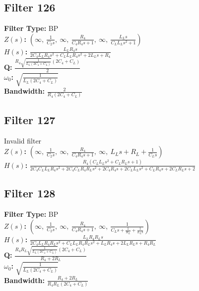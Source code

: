 \documentclass{article}
\begin{document}
\subsection*{Filter 126}
\textbf{Filter Type:} BP \\ 
\textbf{$Z(s)$:} $\left( \infty, \  \frac{1}{C_{2} s}, \  \infty, \  \frac{R_{4}}{C_{4} R_{4} s + 1}, \  \infty, \  \frac{L_{L} s}{C_{L} L_{L} s^{2} + 1}\right)$ \\ 
\textbf{$H(s)$:} $\frac{L_{L} R_{4} s}{2 C_{4} L_{L} R_{4} s^{2} + C_{L} L_{L} R_{4} s^{2} + 2 L_{L} s + R_{4}}$ \\ 
\textbf{Q:} $\frac{R_{4} \sqrt{\frac{1}{L_{L} \left(2 C_{4} + C_{L}\right)}} \left(2 C_{4} + C_{L}\right)}{2}$ \\ 
\textbf{$\omega_0$:} $\sqrt{\frac{1}{L_{L} \left(2 C_{4} + C_{L}\right)}}$ \\ 
\textbf{Bandwidth:} $\frac{2}{R_{4} \left(2 C_{4} + C_{L}\right)}$ \\ 
\subsection*{Filter 127}
Invalid filter \\ 
\textbf{$Z(s)$:} $\left( \infty, \  \frac{1}{C_{2} s}, \  \infty, \  \frac{R_{4}}{C_{4} R_{4} s + 1}, \  \infty, \  L_{L} s + R_{L} + \frac{1}{C_{L} s}\right)$ \\ 
\textbf{$H(s)$:} $\frac{R_{4} \left(C_{L} L_{L} s^{2} + C_{L} R_{L} s + 1\right)}{2 C_{4} C_{L} L_{L} R_{4} s^{3} + 2 C_{4} C_{L} R_{4} R_{L} s^{2} + 2 C_{4} R_{4} s + 2 C_{L} L_{L} s^{2} + C_{L} R_{4} s + 2 C_{L} R_{L} s + 2}$ \\ 
\subsection*{Filter 128}
\textbf{Filter Type:} BP \\ 
\textbf{$Z(s)$:} $\left( \infty, \  \frac{1}{C_{2} s}, \  \infty, \  \frac{R_{4}}{C_{4} R_{4} s + 1}, \  \infty, \  \frac{1}{C_{L} s + \frac{1}{R_{L}} + \frac{1}{L_{L} s}}\right)$ \\ 
\textbf{$H(s)$:} $\frac{L_{L} R_{4} R_{L} s}{2 C_{4} L_{L} R_{4} R_{L} s^{2} + C_{L} L_{L} R_{4} R_{L} s^{2} + L_{L} R_{4} s + 2 L_{L} R_{L} s + R_{4} R_{L}}$ \\ 
\textbf{Q:} $\frac{R_{4} R_{L} \sqrt{\frac{1}{L_{L} \left(2 C_{4} + C_{L}\right)}} \left(2 C_{4} + C_{L}\right)}{R_{4} + 2 R_{L}}$ \\ 
\textbf{$\omega_0$:} $\sqrt{\frac{1}{L_{L} \left(2 C_{4} + C_{L}\right)}}$ \\ 
\textbf{Bandwidth:} $\frac{R_{4} + 2 R_{L}}{R_{4} R_{L} \left(2 C_{4} + C_{L}\right)}$ \\ 
\end{document}
